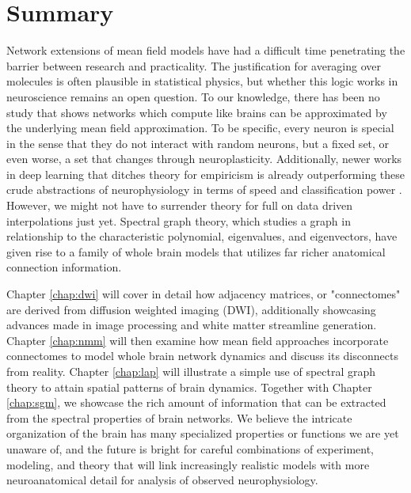 \section{Summary}
Network extensions of mean field models have had a difficult time penetrating the barrier between research and practicality. The justification for averaging over molecules is often plausible in statistical physics, but whether this logic works in neuroscience remains an open question. To our knowledge, there has been no study that shows networks which compute like brains can be approximated by the underlying mean field approximation. To be specific, every neuron is special in the sense that they do not interact with random neurons, but a fixed set, or even worse, a set that changes through neuroplasticity. Additionally, newer works in deep learning that ditches theory for empiricism is already outperforming these crude abstractions of neurophysiology in terms of speed and classification power \cite{goncalves_training_2020,pervaiz_optimising_2020,parmar_spatiotemporal_2020}.  However, we might not have to surrender theory for full on data driven interpolations just yet. Spectral graph theory, which studies a graph in relationship to the characteristic polynomial, eigenvalues, and eigenvectors, have given rise to a family of whole brain models that utilizes far richer anatomical connection information. 

Chapter \ref{chap:dwi} will cover in detail how adjacency matrices, or "connectomes" are derived from diffusion weighted imaging (DWI), additionally showcasing advances made in image processing and white matter streamline generation. Chapter \ref{chap:nmm} will then examine how mean field approaches incorporate connectomes to model whole brain network dynamics and discuss its disconnects from reality. Chapter \ref{chap:lap} will illustrate a simple use of spectral graph theory to attain spatial patterns of brain dynamics. Together with Chapter \ref{chap:sgm}, we showcase the rich amount of information that can be extracted from the spectral properties of brain networks. We believe the intricate organization of the brain has many specialized properties or functions we are yet unaware of, and the future is bright for careful combinations of experiment, modeling, and theory that will link increasingly realistic models with more neuroanatomical detail for analysis of observed neurophysiology. 
